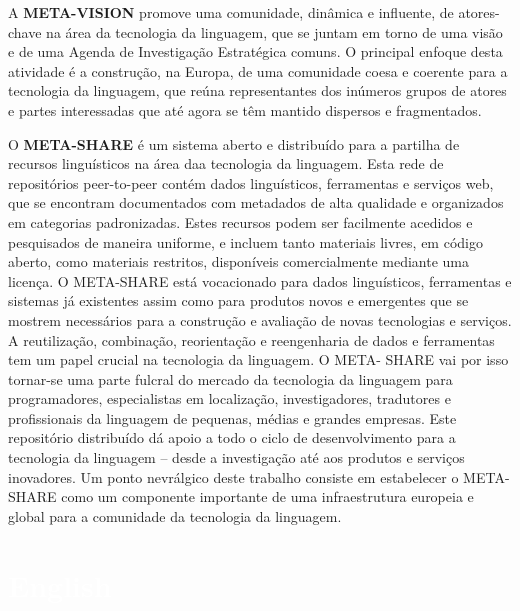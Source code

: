 \begin{multicols}{2}
A \textbf{META-VISION} promove uma comunidade, dinâmica e influente, de atores-chave na área da tecnologia da linguagem, 
que se juntam em torno de uma visão e de uma Agenda de Investigação Estratégica comuns. 
O principal enfoque desta atividade é a construção, na Europa, de uma comunidade coesa e coerente
para a tecnologia da linguagem, que reúna representantes dos inúmeros grupos de atores e partes 
interessadas que até agora se têm mantido dispersos e fragmentados.

O \textbf{META-SHARE} é um sistema aberto e distribuído para a partilha de recursos linguísticos na área daa tecnologia da linguagem. 
Esta rede de repositórios peer-to-peer  contém dados linguísticos, ferramentas e serviços web, 
que se encontram documentados com metadados de alta qualidade e organizados em categorias padronizadas. 
Estes recursos podem ser facilmente acedidos e pesquisados de maneira uniforme, e incluem tanto materiais livres, em código aberto, como materiais restritos, disponíveis comercialmente mediante uma licença. 
O META-SHARE está vocacionado para dados linguísticos, ferramentas e sistemas já existentes assim como para produtos novos e emergentes 
que se mostrem necessários para a construção e avaliação de novas tecnologias e serviços. 
A reutilização, combinação, reorientação e reengenharia de dados e ferramentas tem um papel crucial na tecnologia da linguagem. 
O META- SHARE vai por isso tornar-se uma parte fulcral do mercado da tecnologia da linguagem 
para programadores, especialistas em localização, investigadores, tradutores e profissionais da linguagem de pequenas, médias e grandes empresas. 
Este repositório distribuído dá apoio a todo o ciclo de desenvolvimento para a tecnologia da linguagem -- desde a investigação até aos produtos e serviços inovadores. 
Um ponto nevrálgico deste trabalho consiste em estabelecer o META-SHARE como um componente importante 
de uma infraestrutura europeia e global para a comunidade da tecnologia da linguagem.

\end{multicols}

\vfill

\makeatletter
{}
{
  \renewcommand*{\theHsection}{\thepart.\thesection}
}
\makeatother
\part*{\textcolor{white}{English}}
\setcounter{section}{0}
\setcounter{figure}{0}

